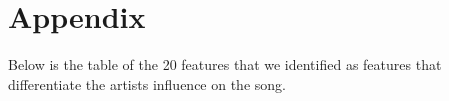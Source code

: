\documentclass{article}\usepackage[]{graphicx}\usepackage[]{xcolor}
\begin{document}
\vspace{2em}

\begin{tiny}

\end{tiny}

\pagebreak
\section{Appendix}

Below is the table of the 20 features that we identified as features that differentiate the artists influence on the song.
\end{document}
